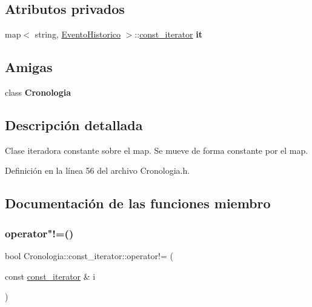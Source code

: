 \subsection*{Atributos privados}
\begin{DoxyCompactItemize}
\item 
\hypertarget{classCronologia_1_1const__iterator_a0ecb3feb36644b596df82f448aa36b1a}{}\label{classCronologia_1_1const__iterator_a0ecb3feb36644b596df82f448aa36b1a} 
map$<$ string, \hyperlink{classEventoHistorico}{Evento\+Historico} $>$\+::\hyperlink{classCronologia_1_1const__iterator}{const\+\_\+iterator} {\bfseries it}
\end{DoxyCompactItemize}
\subsection*{Amigas}
\begin{DoxyCompactItemize}
\item 
\hypertarget{classCronologia_1_1const__iterator_a093d6c964b7fcfece8a1bef43b5bc9ad}{}\label{classCronologia_1_1const__iterator_a093d6c964b7fcfece8a1bef43b5bc9ad} 
class {\bfseries Cronologia}
\end{DoxyCompactItemize}


\subsection{Descripción detallada}
Clase iteradora constante sobre el map. Se mueve de forma constante por el map. 

Definición en la línea 56 del archivo Cronologia.\+h.



\subsection{Documentación de las funciones miembro}
\hypertarget{classCronologia_1_1const__iterator_a06469d58222f3731ebe69b6755d1979c}{}\label{classCronologia_1_1const__iterator_a06469d58222f3731ebe69b6755d1979c} 
\subsubsection{\texorpdfstring{operator"!=()}{operator!=()}}
{\footnotesize\ttfamily bool Cronologia\+::const\+\_\+iterator\+::operator!= (\begin{DoxyParamCaption}\item[{const \hyperlink{classCronologia_1_1const__iterator}{const\+\_\+iterator} \&}]{i }\end{DoxyParamCaption})\hspace{0.3cm}{\ttfamily [inline]}}



